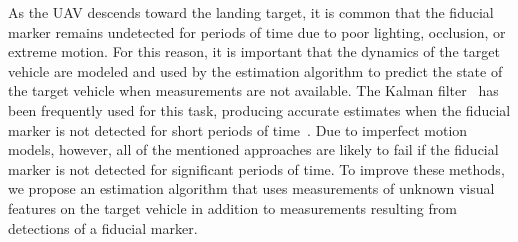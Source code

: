 As the UAV descends toward the landing target, it is common
that the fiducial marker remains undetected
for periods of time due to poor lighting, occlusion, or extreme
motion.
For this reason, it is important that the dynamics of the target vehicle are
modeled and
used by the estimation algorithm to predict the state of the target vehicle
when measurements are not available.
The Kalman filter~\cite{kalman} has been frequently used
for this task, producing accurate estimates 
when the fiducial marker is not detected for
short periods of time~\cite{baca2019autonomous}.
Due to imperfect motion models, however,
all of the mentioned
approaches are likely to fail if the fiducial marker is not detected for
significant periods of time.
To improve these methods, we propose an estimation algorithm that uses
measurements of unknown visual features on the target vehicle in addition to
measurements resulting from detections of a fiducial marker.

